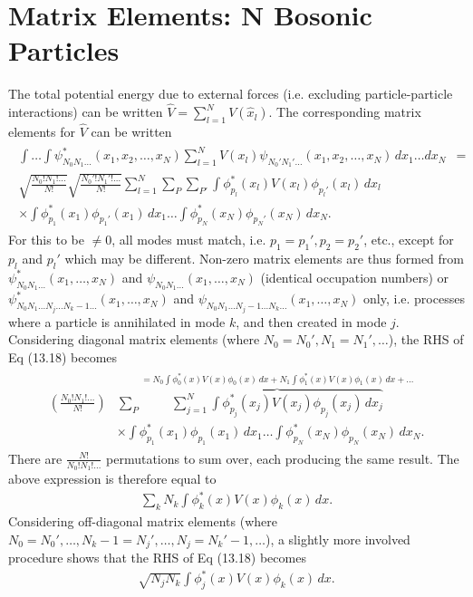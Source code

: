 \documentclass[a4paper, 11pt, normalem]{report}
\begin{document}
\section{Matrix Elements: N Bosonic Particles}
The total potential energy due to external forces (i.e. excluding particle-particle interactions) can be written $\hat{V}=\sum_{l=1}^N V(\hat{x}_l)$.
The corresponding matrix elements for $\hat{V}$ can be written
\begin{align}
    \begin{split}
        \int\dots\int \psi^*_{N_0N_1\dots}(x_1,x_2,\dots,x_N)\sum_{l=1}^N V(x_l)\psi_{N_0'N_1'\dots}(x_1,x_2,\dots,x_N)\,dx_1\dots dx_N &= \\
        \sqrt{\frac{N_0!N_1!\dots}{N!}}\sqrt{\frac{N_0'!N_1'!\dots}{N!}}\sum_{l=1}^N\sum_P\sum_{P'} \int \phi_{p_l}^*(x_l)V(x_l)\phi_{p_l'}(x_l)\,dx_l& \\
        \times\int\phi_{p_1}^*(x_1)\phi_{p_1'}(x_1)\,dx_1\dots\int\phi_{p_N}^*(x_N)\phi_{p_N'}(x_N)\,dx_N.&
    \end{split}
\end{align}
For this to be $\neq0$, all modes must match, i.e. $p_1=p_1',p_2=p_2'$, etc., except for $p_l$ and $p_l'$ which may be different.
Non-zero matrix elements are thus formed from $\psi^*_{N_0N_1\dots}(x_1,\dots,x_N)$ and $\psi_{N_0N_1\dots}(x_1,\dots,x_N)$ (identical occupation numbers) or $\psi^*_{N_0N_1\dots N_j\dots N_k-1\dots}(x_1,\dots,x_N)$ and $\psi_{N_0N_1\dots N_j-1\dots N_k\dots}(x_1,\dots,x_N)$ only, i.e. processes where a particle is annihilated in mode $k$, and then created in mode $j$.
Considering diagonal matrix elements (where $N_0=N_0',N_1=N_1',\dots$), the RHS of Eq (13.18) becomes
\begin{align}
    \begin{split}
        \left(\frac{N_0!N_1!\dots}{N!}\right)& \sum_P \overbrace{\sum_{j=1}^N \int \phi_{p_j}^*(x_j)V(x_j)\phi_{p_j}(x_j)\,dx_j}^{=N_0\int\phi_0^*(x)V(x)\phi_0(x)\,dx + N_1\int\phi_1^*(x)V(x)\phi_1(x)\,dx + \dots} \\
                                             &\times \int \phi_{p_1}^*(x_1)\phi_{p_1}(x_1)\,dx_1\dots\int \phi_{p_N}^*(x_N)\phi_{p_N}(x_N)\,dx_N.
    \end{split}
\end{align}
There are $\frac{N!}{N_0!N_1!\dots}$ permutations to sum over, each producing the same result.
The above expression is therefore equal to
\begin{align}
    \sum_k N_k \int \phi_k^*(x)V(x)\phi_k(x)\,dx.
\end{align}
Considering off-diagonal matrix elements (where $N_0=N_0',\dots,N_k-1=N_j',\dots,N_j=N_k'-1,\dots$), a slightly more involved procedure shows that the RHS of Eq (13.18) becomes
\begin{align}
    \sqrt{N_jN_k}\int \phi_j^*(x)V(x)\phi_k(x)\,dx.
\end{align}
\end{document}
